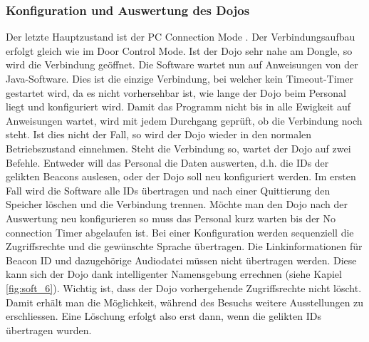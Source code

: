 \subsubsection{Konfiguration und Auswertung des Dojos}
Der letzte Hauptzustand ist der PC Connection Mode . Der Verbindungsaufbau erfolgt gleich wie im Door Control Mode. Ist der Dojo sehr nahe am Dongle, so wird die Verbindung geöffnet. Die Software wartet nun auf Anweisungen von der Java-Software. Dies ist die einzige Verbindung, bei welcher kein Timeout-Timer gestartet wird, da es nicht vorhersehbar ist, wie lange der Dojo beim Personal liegt und konfiguriert wird. Damit das Programm nicht bis in alle Ewigkeit auf Anweisungen wartet, wird mit jedem Durchgang geprüft, ob die Verbindung noch steht. Ist dies nicht der Fall, so wird der Dojo wieder in den normalen Betriebszustand einnehmen. 
Steht die Verbindung so, wartet der Dojo auf zwei Befehle. Entweder will das Personal die Daten auswerten, d.h. die IDs der gelikten Beacons auslesen, oder der Dojo soll neu konfiguriert werden. Im ersten Fall wird die Software alle IDs übertragen und nach einer Quittierung den Speicher löschen und die Verbindung trennen. Möchte man den Dojo nach der Auswertung neu konfigurieren so muss das Personal kurz warten bis der No connection Timer abgelaufen ist. Bei einer Konfiguration werden sequenziell die Zugriffsrechte und die gewünschte Sprache übertragen. Die Linkinformationen für Beacon ID und dazugehörige Audiodatei müssen nicht übertragen werden. Diese kann sich der Dojo dank intelligenter Namensgebung errechnen (siehe Kapiel \ref{fig:soft_6}). Wichtig ist, dass der Dojo vorhergehende Zugriffsrechte nicht löscht. Damit erhält man die Möglichkeit, während des Besuchs weitere Ausstellungen zu erschliessen. Eine Löschung erfolgt also erst dann, wenn die gelikten IDs übertragen wurden.

\newpage

